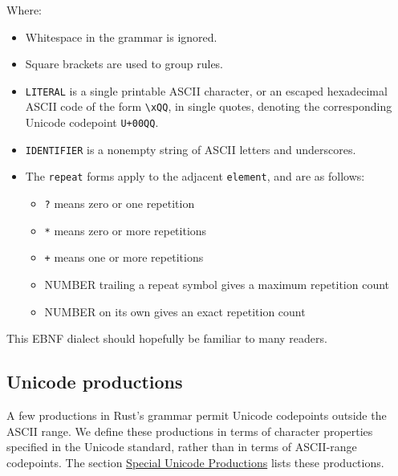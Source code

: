 \documentclass[]{article}
\begin{document}
Where:

\begin{itemize}
\itemsep1pt\parskip0pt
\item
  Whitespace in the grammar is ignored.
\item
  Square brackets are used to group rules.
\item
  \texttt{LITERAL} is a single printable ASCII character, or an escaped
  hexadecimal ASCII code of the form \texttt{\textbackslash{}xQQ}, in
  single quotes, denoting the corresponding Unicode codepoint
  \texttt{U+00QQ}.
\item
  \texttt{IDENTIFIER} is a nonempty string of ASCII letters and
  underscores.
\item
  The \texttt{repeat} forms apply to the adjacent \texttt{element}, and
  are as follows:

  \begin{itemize}
  \itemsep1pt\parskip0pt
  \item
    \texttt{?} means zero or one repetition
  \item
    \texttt{*} means zero or more repetitions
  \item
    \texttt{+} means one or more repetitions
  \item
    NUMBER trailing a repeat symbol gives a maximum repetition count
  \item
    NUMBER on its own gives an exact repetition count
  \end{itemize}
\end{itemize}

This EBNF dialect should hopefully be familiar to many readers.

\subsection{Unicode productions}\label{unicode-productions}

A few productions in Rust's grammar permit Unicode codepoints outside
the ASCII range. We define these productions in terms of character
properties specified in the Unicode standard, rather than in terms of
ASCII-range codepoints. The section
\hyperref[special-unicode-productions]{Special Unicode Productions}
lists these productions.

\end{document}
